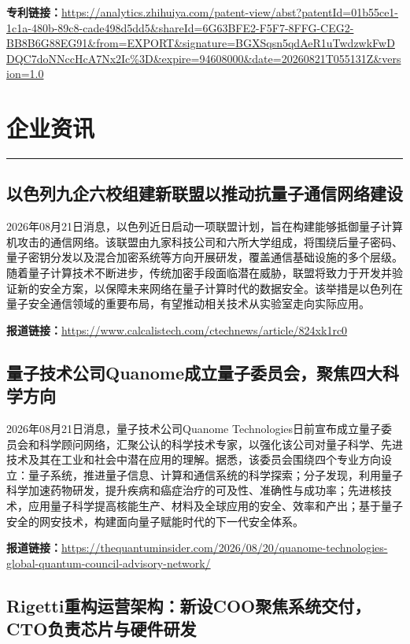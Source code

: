 \documentclass[12pt,a4paper]{ctexart}
\begin{document}
\noindent\textbf{专利链接：}\url{https://analytics.zhihuiya.com/patent-view/abst?patentId=01b55ce1-1c1a-480b-89c8-cade498d5dd5&shareId=6G63BFE2-F5F7-8FFG-CEG2-BB8B6G88EG91&from=EXPORT&signature=BGXSqsn5qdAeR1uTwdzwkFwDDQC7doNNccHcA7Nx2Ic%3D&expire=94608000&date=20260821T055131Z&version=1.0}




\newpage
\section{企业资讯}
\vspace{-0.5em}
\noindent\rule{\linewidth}{1.5pt}

\subsection{ 以色列九企六校组建新联盟以推动抗量子通信网络建设 }

2026年08月21日消息，以色列近日启动一项联盟计划，旨在构建能够抵御量子计算机攻击的通信网络。该联盟由九家科技公司和六所大学组成，将围绕后量子密码、量子密钥分发以及混合加密系统等方向开展研发，覆盖通信基础设施的多个层级。随着量子计算技术不断进步，传统加密手段面临潜在威胁，联盟将致力于开发并验证新的安全方案，以保障未来网络在量子计算时代的数据安全。该举措是以色列在量子安全通信领域的重要布局，有望推动相关技术从实验室走向实际应用。

\noindent\textbf{报道链接：}\url{https://www.calcalistech.com/ctechnews/article/824xk1rc0}

\subsection{ 量子技术公司Quanome成立量子委员会，聚焦四大科学方向 }

2026年08月21日消息，量子技术公司Quanome Technologies日前宣布成立量子委员会和科学顾问网络，汇聚公认的科学技术专家，以强化该公司对量子科学、先进技术及其在工业和社会中潜在应用的理解。据悉，该委员会围绕四个专业方向设立：量子系统，推进量子信息、计算和通信系统的科学探索；分子发现，利用量子科学加速药物研发，提升疾病和癌症治疗的可及性、准确性与成功率；先进核技术，应用量子科学提高核能生产、材料及全球应用的安全、效率和产出；基于量子安全的网安技术，构建面向量子赋能时代的下一代安全体系。

\noindent\textbf{报道链接：}\url{https://thequantuminsider.com/2026/08/20/quanome-technologies-global-quantum-council-advisory-network/}

\subsection{ Rigetti重构运营架构：新设COO聚焦系统交付，CTO负责芯片与硬件研发 }
\end{document}
